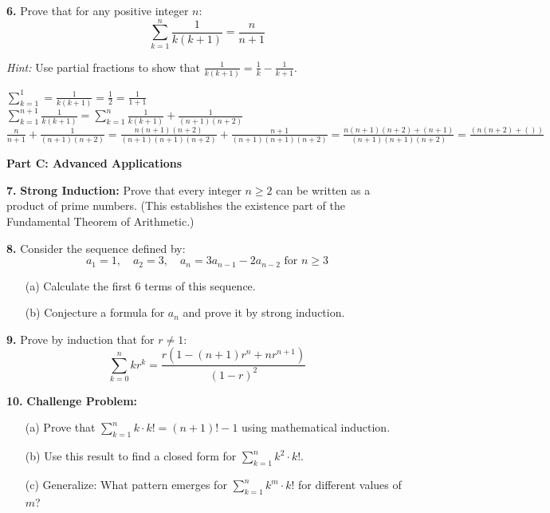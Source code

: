 \documentclass[12pt]{article}
\begin{document}
\textbf{6.} Prove that for any positive integer $n$:
$$\sum_{k=1}^{n} \frac{1}{k(k+1)} = \frac{n}{n+1}$$

\textit{Hint:} Use partial fractions to show that $\frac{1}{k(k+1)} = \frac{1}{k} - \frac{1}{k+1}$.
\\[8pt]
\begin{minipage}[t][5cm][t]{\linewidth}
    $\displaystyle \sum_{k=1}^1=\frac{1}{k(k+1)}=\frac{1}{2}=\frac{1}{1+1}$
    \\[8pt] $\sum_{k=1}^{n+1} \frac{1}{k(k+1)} = \sum_{k=1}^{n} \frac{1}{k(k+1)} + \frac{1}{(n+1)(n+2)}$
    \\[8pt] $\frac{n}{n+1}+\frac{1}{(n+1)(n+2)}=\frac{n(n+1)(n+2)}{(n+1)(n+1)(n+2)}+\frac{n+1}{(n+1)(n+1)(n+2)}=\frac{n(n+1)(n+2)+(n+1)}{(n+1)(n+1)(n+2)}=\frac{(n(n+2)+())}{}$
\end{minipage}

\textbf{Part C: Advanced Applications}

\textbf{7.} \textbf{Strong Induction:} Prove that every integer $n \geq 2$ can be written as a product of prime numbers. (This establishes the existence part of the Fundamental Theorem of Arithmetic.)
\vspace{5cm}

\textbf{8.} Consider the sequence defined by:
$$a_1 = 1, \quad a_2 = 3, \quad a_n = 3a_{n-1} - 2a_{n-2} \text{ for } n \geq 3$$

\begin{enumerate}
\item[(a)] Calculate the first 6 terms of this sequence.
\vspace{3cm}

\item[(b)] Conjecture a formula for $a_n$ and prove it by strong induction.
\vspace{5cm}
\end{enumerate}

\textbf{9.} Prove by induction that for $r \neq 1$:
$$\sum_{k=0}^{n} kr^k = \frac{r(1-(n+1)r^n+nr^{n+1})}{(1-r)^2}$$
\vspace{6cm}

\textbf{10.} \textbf{Challenge Problem:} 

\begin{enumerate}
\item[(a)] Prove that $\sum_{k=1}^{n} k \cdot k! = (n+1)! - 1$ using mathematical induction.
\vspace{4cm}

\item[(b)] Use this result to find a closed form for $\sum_{k=1}^{n} k^2 \cdot k!$.
\vspace{4cm}

\item[(c)] Generalize: What pattern emerges for $\sum_{k=1}^{n} k^m \cdot k!$ for different values of $m$?
\vspace{3cm}
\end{enumerate}
\end{document}
